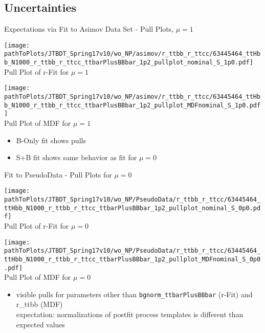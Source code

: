\subsection{Uncertainties}
\begin{frame}{Expectations via Fit to Asimov Data Set - Pull Plots, $\mu = 1$}

\begin{minipage}{0.44\textwidth}
\centering
\texttt{[image: \\pathToPlots/JTBDT\_Spring17v10/wo\_NP/asimov/r\_ttbb\_r\_ttcc/63445464\_ttHbb\_N1000\_r\_ttbb\_r\_ttcc\_ttbarPlusBBbar\_1p2\_pullplot\_nominal\_S\_1p0.pdf]}\\
\vskip -0.2cm
Pull Plot of r-Fit for $\mu = 1$

\end{minipage}
\hfill
\begin{minipage}{0.44\textwidth}
\centering
\texttt{[image: \\pathToPlots/JTBDT\_Spring17v10/wo\_NP/asimov/r\_ttbb\_r\_ttcc/63445464\_ttHbb\_N1000\_r\_ttbb\_r\_ttcc\_ttbarPlusBBbar\_1p2\_pullplot\_MDFnominal\_S\_1p0.pdf]}\\
\vskip -0.2cm
Pull Plot of MDF for $\mu = 1$

\end{minipage}
\begin{itemize}
\item B-Only fit shows pulls
\item S+B fit shows same behavior as fit for $\mu = 0$
\end{itemize}
\end{frame}


\begin{frame}{Fit to PseudoData - Pull Plots for $\mu = 0$}

\begin{minipage}{0.44\textwidth}
\begin{center}
\texttt{[image: \\pathToPlots/JTBDT\_Spring17v10/wo\_NP/PseudoData/r\_ttbb\_r\_ttcc/63445464\_ttHbb\_N1000\_r\_ttbb\_r\_ttcc\_ttbarPlusBBbar\_1p2\_pullplot\_nominal\_S\_0p0.pdf]}\\
Pull Plot of r-Fit for $\mu = 0$
\end{center}

\end{minipage}
\hfill
\begin{minipage}{0.44\textwidth}
\begin{center}
\texttt{[image: \\pathToPlots/JTBDT\_Spring17v10/wo\_NP/PseudoData/r\_ttbb\_r\_ttcc/63445464\_ttHbb\_N1000\_r\_ttbb\_r\_ttcc\_ttbarPlusBBbar\_1p2\_pullplot\_MDFnominal\_S\_0p0.pdf]}\\
Pull Plot of MDF for $\mu = 0$
\end{center}
\end{minipage}
\begin{itemize}
\item visible pulls for parameters other than \texttt{bgnorm\_ttbarPlusBBbar} (r-Fit) and r\_ttbb (MDF)\\
\rar expectation: normalizations of postfit process templates is different than expected values
\end{itemize}
\end{frame}

